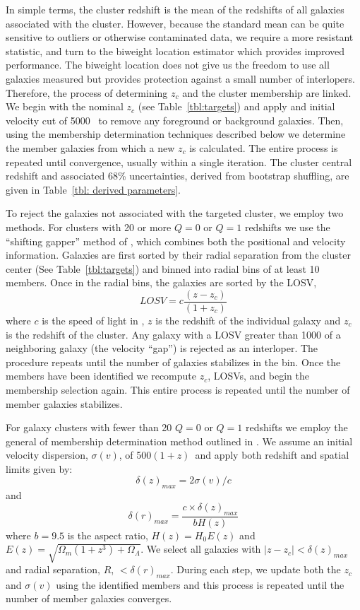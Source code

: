 In simple terms, the cluster redshift is the mean of the redshifts of all galaxies associated with the cluster. However, because the standard mean can be quite sensitive to outliers or otherwise contaminated data, we require a more resistant statistic, and turn to the biweight location estimator \citep{Beers1990} which provides improved performance. The biweight location does not give us the freedom to use all galaxies measured but provides protection against a small number of interlopers. Therefore, the process of determining $z_c$ and the cluster membership are linked. We begin with the nominal $z_c$ (see Table~\ref{tbl:targets}) and apply and initial velocity cut of 5000 \kms\ to remove any foreground or background galaxies. Then, using the membership determination techniques described below we determine the member galaxies from which a new $z_c$ is calculated. The entire process is repeated until convergence, usually within a single iteration. The cluster central redshift and associated 68\% uncertainties, derived from bootstrap shuffling, are given in Table~\ref{tbl: derived parameters}.

To reject the galaxies not associated with the targeted cluster, we employ two methods. For clusters with 20 or more $Q=0$ or $Q=1$ redshifts we use the ``shifting gapper'' method of , which combines both the positional and velocity information. Galaxies are first sorted by their radial separation from the cluster center (See Table~\ref{tbl:targets}) and binned into radial bins of at least 10 members. Once in the radial bins, the galaxies are sorted by the LOSV, 
\begin{equation}
	LOSV = c\frac{(z-z_{c})}{(1+z_{c})} 
\end{equation}
where $c$ is the speed of light in \kms, $z$ is the redshift of the individual galaxy and $z_{c}$ is the redshift of the cluster. Any galaxy with a LOSV greater than 1000 \kms of a neighboring galaxy (the velocity ``gap'') is rejected as an interloper. The procedure repeats until the number of galaxies stabilizes in the bin. Once the members have been identified we recompute $z_c$, LOSVs, and begin the membership selection again. This entire process is repeated until the number of member galaxies stabilizes. 

For galaxy clusters with fewer than 20 $Q=0$ or $Q=1$ redshifts we employ the general of membership determination method outlined in \cite{Wilman2005, Connelly2012}. We assume an initial velocity dispersion, $\sigma(v)$, of 500$(1+z)$\kms\ and apply both redshift and spatial limits given by: 
\begin{equation}
	\delta(z)_{max} = 2 \sigma(v)/c 
\end{equation}
and 
\begin{equation}
	\delta(r)_{max} = \frac{c\times\delta(z)_{max}}{bH(z)} 
\end{equation}
where $b=9.5$ is the aspect ratio, $H(z) = H_0 E(z)$ and $E(z) = \sqrt{\Omega_m(1+z^3)+\Omega_{\Lambda}}$. We select all galaxies with $|z-z_c| < \delta(z)_{max}$ and radial separation, $R$, $<\delta(r)_{max}$. During each step, we update both the $z_c$ and $\sigma(v)$ using the identified members and this process is repeated until the number of member galaxies converges. 

